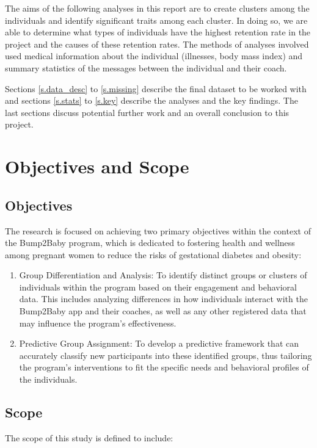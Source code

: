 \documentclass[12pt]{article}
\begin{document}
		The aims of the following analyses in this report are to create clusters among the individuals and identify significant traits among each cluster. In doing so, we are able to determine what types of individuals have the highest retention rate in the project and the causes of these retention rates. The methods of analyses involved used medical information about the individual (illnesses, body mass index) and summary statistics of the messages between the individual and their coach.
		
		Sections \ref{s.data_desc} to \ref{s.missing} describe the final dataset to be worked with and sections \ref{s.stats} to \ref{s.key} describe the analyses and the key findings. The last sections discuss potential further work and an overall conclusion to this project.

\section{Objectives and Scope}

\label{s.obj&s}

\subsection{Objectives}
The research is focused on achieving two primary objectives within the context of the Bump2Baby program, which is dedicated to fostering health and wellness among pregnant women to reduce the risks of gestational diabetes and obesity:

\begin{enumerate}
\item Group Differentiation and Analysis: To identify distinct groups or clusters of individuals within the program based on their engagement and behavioral data. This includes analyzing differences in how individuals interact with the Bump2Baby app and their coaches, as well as any other registered data that may influence the program's effectiveness.

\item Predictive Group Assignment: To develop a predictive framework that can accurately classify new participants into these identified groups, thus tailoring the program's interventions to fit the specific needs and behavioral profiles of the individuals.
\end{enumerate}

\subsection{Scope}
The scope of this study is defined to include:
\end{document}
